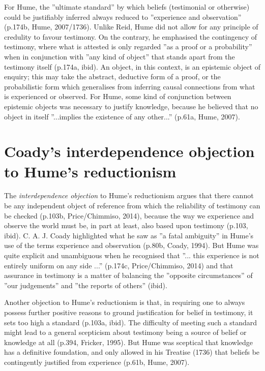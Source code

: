 \documentclass[a4paper, 11pt]{article} %
\begin{document}
\vspace{10pt}

For Hume, the ''ultimate standard'' by which beliefs (testimonial or otherwise) could be justifiably inferred always reduced to ''experience and observation'' (p.174b, Hume, 2007/1736)\cite{Hume:2007}. Unlike Reid, Hume did not allow for any principle of credulity to favour testimony. On the contrary, he emphasised the contingency of testimony, where what is attested is only regarded ''as a proof or a probability'' when in conjunction with ''any kind of object'' that stands apart from the testimony itself (p.174a, ibid)\cite{Hume:2007}. An object, in this context, is an epistemic object of enquiry; this may take the abstract, deductive form of a proof, or the probabilistic form which generalises from inferring causal connections from what is experienced or observed. For Hume, some kind of conjunction between epistemic objects was necessary to justify knowledge, because he believed that no object in itself ''...implies the existence of any other...'' (p.61a, Hume, 2007)\cite{Hume:2007}. 

\section*{Coady's interdependence objection to Hume's reductionism}

The \textit{interdependence objection} to Hume's reductionism argues that there cannot be any independent object of reference from which the reliability of testimony can be checked (p.103b, Price/Chimmiso, 2014)\cite{Price/Chismisso:2014}, because the way we experience and observe the world must be, in part at least, also based upon testimony (p.103, ibid). C. A. J. Coady highlighted what he saw as ''a fatal ambiguity'' in Hume's use of the terms experience and observation (p.80b, Coady, 1994)\cite{Coady:1994}. But Hume was quite explicit and unambiguous when he recognised that ''... this experience is not entirely uniform on any side ...'' (p.174c, Price/Chimmiso, 2014)\cite{Price/Chismisso:2014} and that assurance in testimony is a matter of balancing the ''opposite circumstances'' of ''our judgements'' and ''the reports of others'' (ibid)\cite{Price/Chismisso:2014}. 

\vspace{10pt}

Another objection to Hume's reductionism is that, in requiring one to always possess further positive reasons to ground justification for belief in testimony, it sets too high a standard (p.103a, ibid)\cite{Price/Chismisso:2014}. The difficulty of meeting such a standard might lead to a general scepticism about testimony being a source of belief or knowledge at all (p.394, Fricker, 1995)\cite{Fricker:1995}. But Hume was sceptical that knowledge has a definitive foundation, and only allowed in his Treatise (1736) that beliefs be contingently justified from experience (p.61b, Hume, 2007)\cite{Hume:2007}. 
\end{document}
